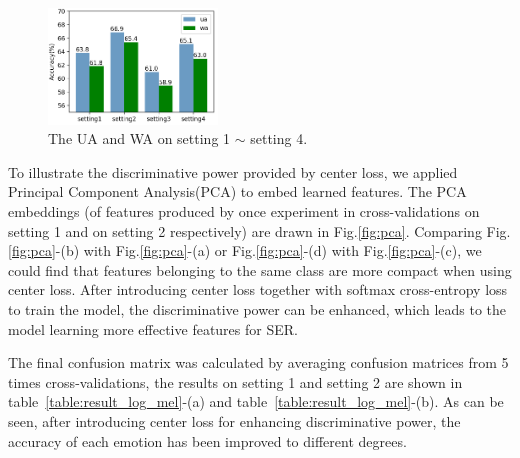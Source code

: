 \documentclass{article}
\begin{document}
\begin{figure}[htb]
	\begin{minipage}[b]{1.0\linewidth}
		\centerline{\includegraphics[width=4.5cm]{fig6}}
	\end{minipage}
	\caption{The UA and WA on setting 1 $\sim$ setting 4.}
	\label{fig:setting1-4}
\end{figure}

To illustrate the discriminative power provided by center loss, we applied Principal Component Analysis({PCA}) to embed learned features. The PCA embeddings (of features produced by once experiment in cross-validations on setting 1 and on setting 2 respectively) are drawn in Fig.\ref{fig:pca}. Comparing Fig.\ref{fig:pca}-(b) with Fig.\ref{fig:pca}-(a) or Fig.\ref{fig:pca}-(d) with Fig.\ref{fig:pca}-(c), we could find that features belonging to the same class are more compact when using center loss. After introducing center loss together with softmax cross-entropy loss to train the model, the discriminative power can be enhanced, which leads to the model learning more effective features for SER.

The final confusion matrix was calculated by averaging confusion matrices from 5 times cross-validations, the results on setting 1 and setting 2 are shown in table~\ref{table:result_log_mel}-(a) and table~\ref{table:result_log_mel}-(b). As can be seen, after introducing center loss for enhancing discriminative power, the accuracy of each emotion has been improved to different degrees.
\end{document}
